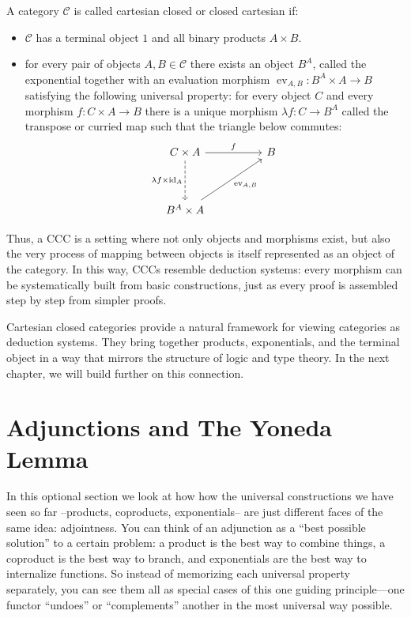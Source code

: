 \begin{definition} A category $\mathcal{C}$ is called cartesian closed or closed cartesian if:
\begin{itemize}
  \item $\mathcal{C}$ has a terminal object $1$ and all binary products $A\times B$.
  \item for every pair of objects $A,B\in\mathcal{C}$ there exists an object $B^{A}$, called the exponential together with an evaluation morphism
  \(
    \operatorname{ev}_{A,B} : B^{A}\times A \longrightarrow B
  \)
  satisfying the following universal property: for every object $C$ and every morphism
  \(
    f : C\times A \longrightarrow B
  \)
  there is a unique morphism $\lambda f : C \longrightarrow B^{A}$ called the transpose or curried map such that the triangle below commutes:
  \[
    \begin{tikzcd}[row sep=huge, column sep=huge]
      C\times A \arrow[r,"f"] \arrow[d, dashed, "\lambda f \times \mathrm{id}_A"'] & B \\
      B^{A}\times A \arrow[ur,"\operatorname{ev}_{A,B}"'] &
    \end{tikzcd}
  \]  
\end{itemize}
\end{definition}

Thus, a CCC is a setting where not only objects and morphisms exist, but also the very process of mapping between objects is itself represented as an object of the category. In this way, CCCs resemble deduction systems: every morphism can be systematically built from basic constructions, just as every proof is assembled step by step from simpler proofs.

Cartesian closed categories provide a natural framework for viewing categories as deduction systems. They bring together products, exponentials, and the terminal object in a way that mirrors the structure of logic and type theory. In the next
chapter, we will build further on this connection.

\section[(Optional) Adjunctions and The Yoneda Lemma]{\centering Adjunctions and The Yoneda Lemma}

In this optional section we look at how how the universal constructions we have seen so far --products, coproducts, exponentials-- are just different faces of the same idea: adjointness. You can think of an adjunction as a ``best possible solution'' to a certain problem: a product is the best way to combine things, a coproduct is the best way to branch, and exponentials are the best way to internalize functions. So instead of memorizing each universal property separately, you can see them all as special cases of this one guiding principle—one functor ``undoes'' or ``complements'' another in the most universal way possible.

